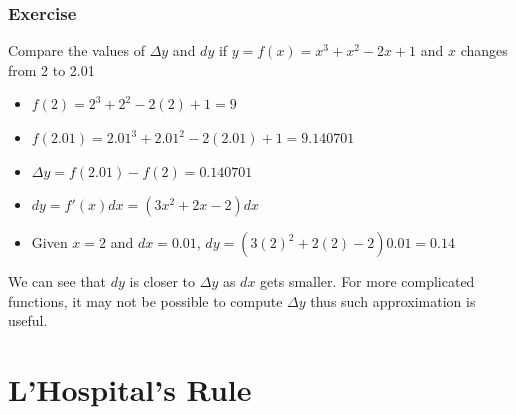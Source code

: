 \documentclass[t]{beamer}
\theoremstyle{plain}
\theoremstyle{definition}
\begin{document}
\begin{frame}

\frametitle{Exercise}

Compare the values of $\Delta{y}$ and $dy$ if $y=f(x) = x^3 + x^2 - 2x + 1$ and $x$ changes from 2 to 2.01 \pause

\begin{itemize}
	\item $f(2) = 2^3 + 2^2 - 2(2) + 1 = 9$
	\item $f(2.01) = 2.01^3 + 2.01^2 - 2(2.01) + 1 = 9.140701$
	\item $\Delta{y} = f(2.01) - f(2) = 0.140701$
	\item $dy = f'(x)dx = (3x^2 + 2x - 2)dx$
	\item Given $x=2$ and $dx = 0.01$, $dy = (3(2)^2 + 2(2) -2)0.01 = 0.14$
\end{itemize}

We can see that $dy$  is closer to $\Delta{y}$ as $dx$ gets smaller.  For more complicated functions, it may not be possible to compute $\Delta{y}$ thus such approximation is useful.

\end{frame}

\section{L'Hospital's Rule}
\end{document}

